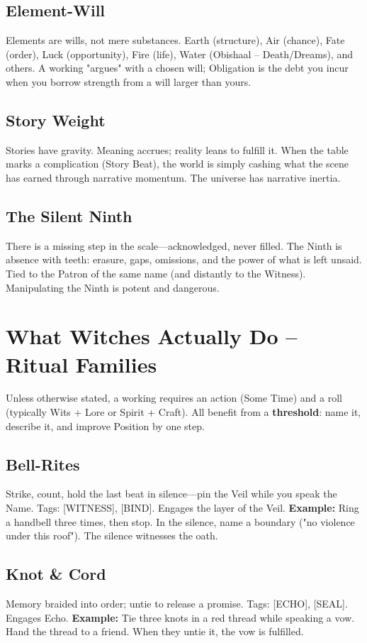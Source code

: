 \documentclass[10pt,a5paper]{book}
\begin{document}
\subsection{Element-Will}
Elements are wills, not mere substances. Earth (structure), Air (chance), Fate (order), Luck (opportunity), Fire (life), Water (Obishaal -- Death/Dreams), and others. A working "argues" with a chosen will; Obligation is the debt you incur when you borrow strength from a will larger than yours.

\subsection{Story Weight}
Stories have gravity. Meaning accrues; reality leans to fulfill it. When the table marks a complication (Story Beat), the world is simply cashing what the scene has earned through narrative momentum. The universe has narrative inertia.

\subsection{The Silent Ninth}
There is a missing step in the scale---acknowledged, never filled. The Ninth is absence with teeth: erasure, gaps, omissions, and the power of what is left unsaid. Tied to the Patron of the same name (and distantly to the Witness). Manipulating the Ninth is potent and dangerous.

\section{What Witches Actually Do -- Ritual Families}

Unless otherwise stated, a working requires an action (Some Time) and a roll (typically Wits + Lore or Spirit + Craft). All benefit from a \textbf{threshold}: name it, describe it, and improve Position by one step.

\subsection{Bell-Rites}
Strike, count, hold the last beat in silence---pin the Veil while you speak the Name. Tags: [WITNESS], [BIND]. Engages the layer of the Veil.
\textbf{Example:} Ring a handbell three times, then stop. In the silence, name a boundary ("no violence under this roof"). The silence witnesses the oath.

\subsection{Knot \& Cord}
Memory braided into order; untie to release a promise. Tags: [ECHO], [SEAL]. Engages Echo.
\textbf{Example:} Tie three knots in a red thread while speaking a vow. Hand the thread to a friend. When they untie it, the vow is fulfilled.
\end{document}
